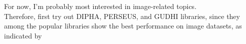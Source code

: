 \documentclass[10pt,a4paper]{article}
\begin{document}
For now, I'm probably most interested in image-related topics.\\
Therefore, first try out DIPHA, PERSEUS, and GUDHI libraries, since they among the popular libraries show the best performance on image datasets, as indicated by \cite{Otter2017}

\newpage


\end{document}
